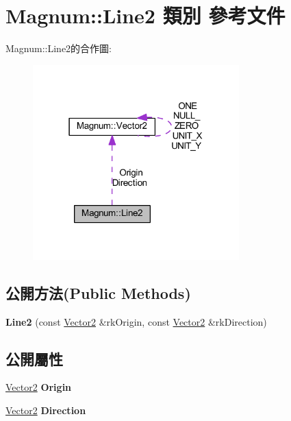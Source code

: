 \hypertarget{class_magnum_1_1_line2}{}\section{Magnum\+:\+:Line2 類別 參考文件}
\label{class_magnum_1_1_line2}


Magnum\+:\+:Line2的合作圖\+:\nopagebreak
\begin{figure}[H]
\begin{center}
\leavevmode
\includegraphics[width=226pt]{class_magnum_1_1_line2__coll__graph}
\end{center}
\end{figure}
\subsection*{公開方法(Public Methods)}
\begin{DoxyCompactItemize}
\item 
{\bfseries Line2} (const \hyperlink{class_magnum_1_1_vector2}{Vector2} \&rk\+Origin, const \hyperlink{class_magnum_1_1_vector2}{Vector2} \&rk\+Direction)\hypertarget{class_magnum_1_1_line2_a13512f97911498683031733fcc27e2e4}{}\label{class_magnum_1_1_line2_a13512f97911498683031733fcc27e2e4}

\end{DoxyCompactItemize}
\subsection*{公開屬性}
\begin{DoxyCompactItemize}
\item 
\hyperlink{class_magnum_1_1_vector2}{Vector2} {\bfseries Origin}\hypertarget{class_magnum_1_1_line2_aa63294a3a946d9004cc7ca5aaaca4d7c}{}\label{class_magnum_1_1_line2_aa63294a3a946d9004cc7ca5aaaca4d7c}

\item 
\hyperlink{class_magnum_1_1_vector2}{Vector2} {\bfseries Direction}\hypertarget{class_magnum_1_1_line2_a58d98a258819e336ae7182ebdbcd8613}{}\label{class_magnum_1_1_line2_a58d98a258819e336ae7182ebdbcd8613}

\end{DoxyCompactItemize}


